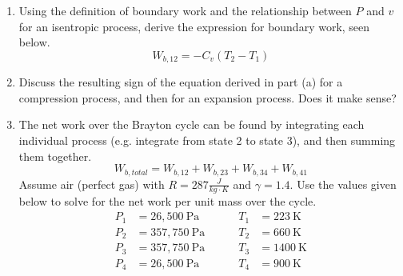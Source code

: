 \documentclass[letterpaper,12pt]{article}
\begin{document}
\begin{enumerate}[label=(\alph*)]
\item Using the definition of boundary work and the relationship between $P$ and $v$ for an isentropic process, derive the expression for boundary work, seen below.
\begin{equation}
	W_{b,12} = -C_v\left(T_2-T_1\right)
\end{equation}
\item Discuss the resulting sign of the equation derived in part (a) for a compression process, and then for an expansion process.  Does it make sense?
\item The net work over the Brayton cycle can be found by integrating each individual process (e.g. integrate from state 2 to state 3), and then summing them together.
\begin{equation}
	W_{b,total} = W_{b,12} + W_{b,23} + W_{b,34} + W_{b,41}
\end{equation}
Assume air (perfect gas) with $R = 287 \frac{J}{kg \cdot K}$ and $\gamma = 1.4$.  Use the values given below to solve for the net work per unit mass over the cycle.
\begin{equation}
\begin{aligned}
	P_1 &= 26,500~\mathrm{Pa}~~~~~~~~~~& T_1 &= 223~\mathrm{K} \\
	P_2 &= 357,750~\mathrm{Pa}~~~~~~~~~~& T_2 &= 660~\mathrm{K} \\
	P_3 &= 357,750~\mathrm{Pa}~~~~~~~~~~& T_3 &= 1400~\mathrm{K} \\
	P_4 &= 26,500~\mathrm{Pa}~~~~~~~~~~& T_4 &= 900~\mathrm{K} \\
\end{aligned}
\end{equation}
\end{enumerate}
\end{document}
